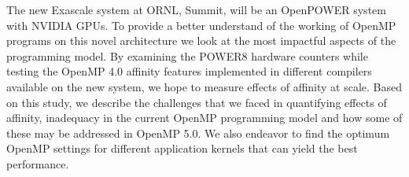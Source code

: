 The new Exascale system at ORNL, Summit, will be an OpenPOWER system with NVIDIA GPUs. To provide a better understand of the working of OpenMP 
programs on this novel architecture we look at the most impactful aspects of the programming model. By examining the POWER8 hardware counters while testing the OpenMP 4.0 affinity features implemented in different compilers available on the new system, we hope to measure effects of affinity at scale. Based on this study, we describe the challenges that we faced in quantifying effects of affinity, inadequacy in the current OpenMP programming model and how some of these may be addressed in OpenMP 5.0. We also endeavor to find the optimum OpenMP settings for different application kernels that can yield the best performance.